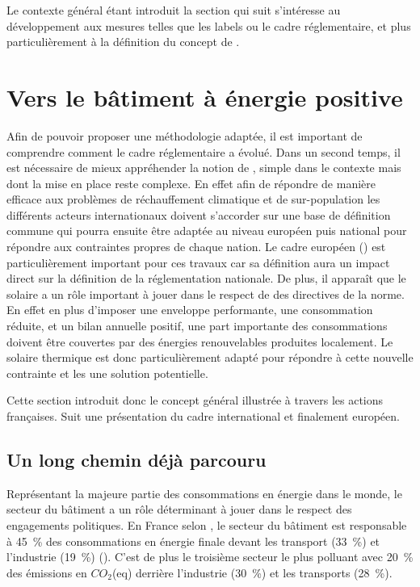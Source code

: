 Le contexte général étant introduit la section qui suit s’intéresse au développement
aux mesures telles que les labels ou le cadre réglementaire, et plus particulièrement
à la définition du concept de .





\section{Vers le bâtiment à énergie positive} %
\label{sec:vers_le_batiment_a_energie_positive}
Afin de pouvoir proposer une méthodologie adaptée, il est important de comprendre comment
le cadre réglementaire a évolué. Dans un second temps, il est nécessaire de mieux
appréhender la notion de , simple dans le contexte mais dont la mise en place
reste complexe. En effet afin de répondre de manière efficace aux problèmes de
réchauffement climatique et de sur-population les différents acteurs internationaux
doivent s’accorder sur une base de définition commune qui pourra ensuite être adaptée au
niveau européen puis national pour répondre aux contraintes propres de chaque nation. Le
cadre européen () est particulièrement important pour ces travaux car
sa définition aura un impact direct sur la définition de la réglementation nationale. De
plus, il apparaît que le solaire a un rôle important à jouer dans le respect de des
directives de la norme. En effet en plus d’imposer une enveloppe performante, une
consommation réduite, et un bilan annuelle positif, une part importante des consommations
doivent être couvertes par des énergies renouvelables produites localement. Le solaire
thermique est donc particulièrement adapté pour répondre à cette nouvelle contrainte et
les  une solution potentielle.

Cette section introduit donc le concept général illustrée à travers les actions françaises.
Suit une présentation du cadre international et finalement européen.
\subsection{Un long chemin déjà parcouru} %
\label{sub:un_long_chemin_deja_parcouru}
Représentant la majeure partie des consommations en énergie dans le monde, le secteur du
bâtiment a un rôle déterminant à jouer dans le respect des engagements politiques. En
France selon \textcite{ADEME2015}, le secteur du bâtiment est responsable à
\SI{45}{\percent} des consommations en énergie finale devant les transport
(\SI{33}{\percent}) et l’industrie (\SI{19}{\percent})
(). C’est de plus le troisième secteur le plus
polluant avec \SI{20}{\percent} des émissions en $CO_{2}$(eq) derrière
l’industrie (\SI{30}{\percent}) et les transports (\SI{28}{\percent}).


